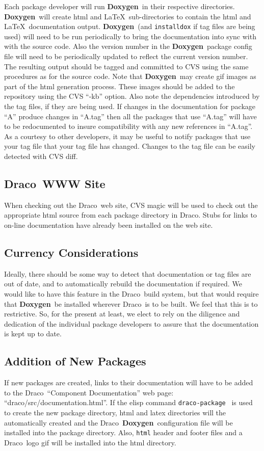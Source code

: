 \documentclass[11pt]{nmemo}
\newcommand{\draco}{{\normalfont\sffamily Draco}}
\newcommand{\doxy}{{\normalfont\bfseries Doxygen}}
\begin{document}
Each package developer will run \doxy\ in their respective
directories.  \doxy\ will create html and \LaTeX\ sub-directories to
contain the html and \LaTeX\ documentation output. \doxy\ (and
\texttt{installdox} if tag files are being used) will need to
be run periodically to bring the documentation into sync with with the
source code. Also the version number in the \doxy\ package config
file will need to be periodically updated to reflect the current version number.
The resulting output should be tagged and committed to
CVS using the same procedures as for the source code. Note that
\doxy\ may create gif images as part of the html generation
process. These images should be added to the repository
using the CVS ``-kb'' option. Also note the
dependencies introduced by the tag files, if they are being used.
If changes in the documentation for package ``A'' produce
changes in ``A.tag'' then all the packages
that use ``A.tag'' will have to be redocumented to insure compatibility
with any new references in ``A.tag''. As a courtesy to other
developers, it may be useful to notify packages that use your tag file
that your tag file has changed. Changes to the tag file can be
easily detected with CVS diff.

\subsection{\draco\ WWW Site}

When checking out the \draco\ web site, CVS magic will be used to
check out the appropriate html source from each package directory in
\draco. Stubs for links to on-line documentation have already been
installed on the web site.

\subsection{Currency Considerations}
Ideally, there should be some way to detect that documentation
or tag files are out of date, and to automatically rebuild the
documentation if required. We would like to have this feature in the
\draco\ build system, but that would require that \doxy\
be installed wherever \draco\ is to be built. We feel that this
is to restrictive. So, for the present at least, we elect to rely
on the diligence and dedication of the individual package developers to 
assure that the documentation is kept up to date.

\subsection{Addition of New Packages}
If new packages are created, links to their documentation will have
to be added to the \draco\ ``Component Documentation'' web page:
``draco/src/documentation.html''.
If the elisp command
\texttt{draco-package}~\cite{xtm:9909} is used to create the new package
directory, html and latex directories will the automatically created and 
the \draco\ \doxy\ configuration file will be installed into the package
directory. Also, \texttt{html} header and footer files and a \draco\
logo gif will be installed into the html directory.
\end{document}
